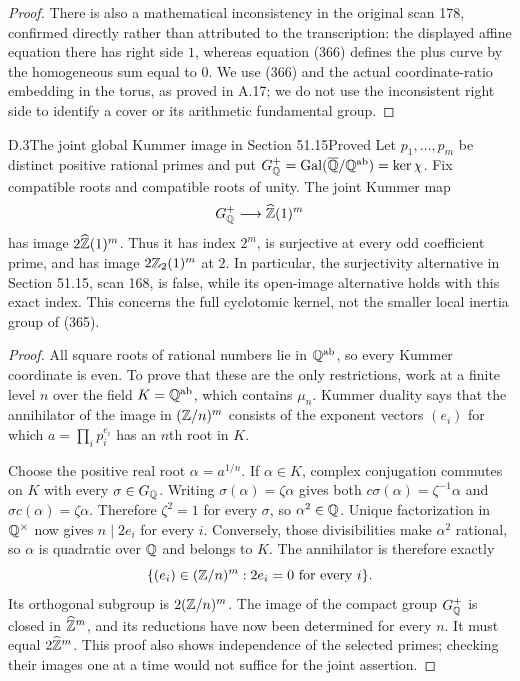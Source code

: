 \begin{proof}
There is also a mathematical inconsistency in the original scan 178,
confirmed directly rather than attributed to the transcription: the displayed
affine equation there has right side $1$, whereas equation (366) defines
the plus curve by the homogeneous sum equal to $0$. We use (366) and
the actual coordinate-ratio embedding in the torus, as proved in A.17;
we do not use the inconsistent right side to identify a cover or its
arithmetic fundamental group.
\end{proof}

\begin{statement}{D.3}{The joint global Kummer image in Section 51.15}{Proved}
Let $p_1,\ldots,p_m$ be distinct positive rational primes and put
$G_{\mathbb Q}^{+}=\operatorname{Gal}(\overline{\mathbb Q}/\mathbb Q^{\mathrm{ab}})=\ker\chi$.
Fix compatible roots and compatible roots of unity. The joint Kummer map
\[
G_{\mathbb Q}^{+}\longrightarrow\widehat{\mathbb Z}(1)^m
\]
has image $2\widehat{\mathbb Z}(1)^m$. Thus it has index $2^m$, is surjective at every
odd coefficient prime, and has image $2\mathbb Z_2(1)^m$ at $2$. In particular,
the surjectivity alternative in Section 51.15, scan 168, is false, while
its open-image alternative holds with this exact index. This concerns
the full cyclotomic kernel, not the smaller local inertia group of (365).
\end{statement}
\begin{proof}
All square roots of rational numbers lie in $\mathbb Q^{\mathrm{ab}}$, so every
Kummer coordinate is even. To prove that these are the only restrictions,
work at a finite level $n$ over the field $K=\mathbb Q^{\mathrm{ab}}$, which
contains $\mu_n$. Kummer duality says that the annihilator of the image
in $(\mathbb Z/n)^m$ consists of the exponent vectors $(e_i)$ for which
$a=\prod_i p_i^{e_i}$ has an $n$th root in $K$.

Choose the positive real root $\alpha=a^{1/n}$. If $\alpha\in K$, complex
conjugation commutes on $K$ with every $\sigma\in G_\mathbb Q$. Writing
$\sigma(\alpha)=\zeta\alpha$ gives both
$c\sigma(\alpha)=\zeta^{-1}\alpha$ and
$\sigma c(\alpha)=\zeta\alpha$. Therefore $\zeta^2=1$ for every
$\sigma$, so $\alpha^2\in\mathbb Q$. Unique factorization in $\mathbb Q^\times$ now
gives $n\mid2e_i$ for every $i$. Conversely, those divisibilities make
$\alpha^2$ rational, so $\alpha$ is quadratic over $\mathbb Q$ and belongs to
$K$. The annihilator is therefore exactly
\[
\{(e_i)\in(\mathbb Z/n)^m:2e_i=0\ \text{for every }i\}.
\]
Its orthogonal subgroup is $2(\mathbb Z/n)^m$. The image of the compact group
$G_\mathbb Q^+$ is closed in $\widehat{\mathbb Z}^m$, and its reductions have now been
determined for every $n$. It must equal $2\widehat{\mathbb Z}^m$. This proof also
shows independence of the selected primes; checking their images one at
a time would not suffice for the joint assertion.
\end{proof}

